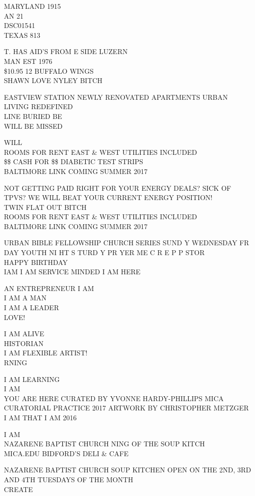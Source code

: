 \documentclass[10pt,letterpaper]{article}
\begin{document}
MARYLAND 1915\\
AN 21\\
DSC01541\\
TEXAS 813

T. HAS AID'S FROM E SIDE LUZERN\\
MAN EST 1976\\
\$10.95 12 BUFFALO WINGS\\
SHAWN LOVE NYLEY BITCH

EASTVIEW STATION NEWLY RENOVATED APARTMENTS URBAN LIVING REDEFINED\\
LINE BURIED BE\\
WILL BE MISSED

WILL\\
ROOMS FOR RENT EAST \& WEST UTILITIES INCLUDED\\
\$\$ CASH FOR \$\$ DIABETIC TEST STRIPS\\
BALTIMORE LINK COMING SUMMER 2017

NOT GETTING PAID RIGHT FOR YOUR ENERGY DEALS?  SICK OF TPVS?  WE WILL BEAT YOUR CURRENT ENERGY POSITION!\\
TWIN FLAT OUT BITCH\\
ROOMS FOR RENT EAST \& WEST UTILITIES INCLUDED\\
BALTIMORE LINK COMING SUMMER 2017

URBAN BIBLE FELLOWSHIP CHURCH SERIES SUND Y WEDNESDAY FR DAY YOUTH NI HT S TURD Y PR YER ME C R E P P STOR\\
HAPPY BIRTHDAY\\
IAM I AM SERVICE MINDED I AM HERE

AN ENTREPRENEUR I AM\\
I AM A MAN\\
I AM A LEADER\\
LOVE!

I AM ALIVE\\
HISTORIAN\\
I AM FLEXIBLE ARTIST!\\
RNING

I AM LEARNING\\
I AM\\
YOU ARE HERE CURATED BY YVONNE HARDY{-}PHILLIPS MICA CURATORIAL PRACTICE 2017 ARTWORK BY CHRISTOPHER METZGER I AM THAT I AM 2016

I AM\\
NAZARENE BAPTIST CHURCH NING OF THE SOUP KITCH\\
MICA.EDU BIDFORD'S DELI \& CAFE

NAZARENE BAPTIST CHURCH SOUP KITCHEN OPEN ON THE 2ND, 3RD AND 4TH TUESDAYS OF THE MONTH\\
CREATE
\end{document}
